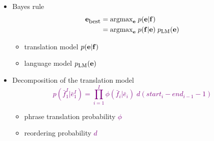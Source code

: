 \documentclass[landscape]{slides}
\newcommand{\maths}[1]{\textcolor{purple}{#1}}
\begin{document}

\begin{itemize}
\item Bayes rule\vspace{-5mm}
\maths{\begin{equation*}
\begin{split} 
{\bf e}_{\mbox{\small best}} = & \; \mbox{argmax}_{\bf e} \; p({\bf e}|{\bf f})\\ 
= & \; \mbox{argmax}_{\bf e} \; p({\bf f}|{\bf e}) \; p_{\mbox{\sc lm}}({\bf e})
\end{split} 
\end{equation*}}\vspace{-15mm}
\begin{itemize}
\item translation model \maths{$p({\bf e}|{\bf f})$}
\item language model \maths{$p_{\mbox{\sc lm}}({\bf e})$}
\end{itemize}
\item Decomposition of the translation model\vspace{-5mm}
\maths{\begin{equation*} 
p(\bar{f}_1^I|\bar{e}_1^I) = \prod_{i=1}^I \phi(\bar{f}_i|\bar{e}_i) \; d(start_i-end_{i-1}-1)
\label{eqn:pb:phrase-based-model-transprob}
\end{equation*}} 
\begin{itemize} \vspace{-5mm}
\item phrase translation probability \maths{$\phi$}
\item reordering probability \maths{$d$}
\end{itemize}
\end{itemize}

\end{document}
